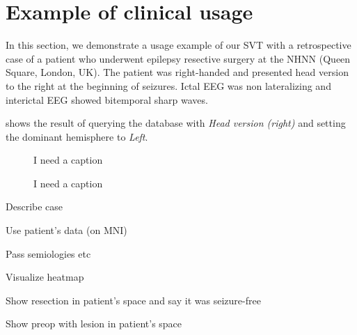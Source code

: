\section{Example of clinical usage}


In this section, we demonstrate a usage example of our \ac{SVT} with a retrospective case of a patient who underwent epilepsy resective surgery at the \ac{NHNN} (Queen Square, London, UK).
The patient was right-handed and presented head version to the right at the beginning of seizures.
Ictal \ac{EEG} was non lateralizing and interictal \ac{EEG} showed bitemporal sharp waves.

 shows the result of querying the database with \textit{Head version (right)} and setting the dominant hemisphere to \textit{Left}.

\begin{figure}
  \centering
  \caption[Caapt       ion]{
    I need a caption
  }
  \label{fig:svt_case_heatmap}
\end{figure}


\begin{figure}
  \centering
  \caption[Caapt       ion]{
    I need a caption
  }
  \label{fig:svt_resection}
\end{figure}



Describe case

Use patient's data (on MNI)

Pass semiologies etc

Visualize heatmap

Show resection in patient's space and say it was seizure-free

Show preop with lesion in patient's space
